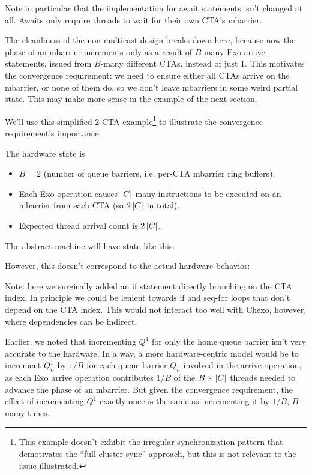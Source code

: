 \filbreak
Note in particular that the implementation for await statements isn't changed at all.
Awaits only require threads to wait for their own CTA's mbarrier.

\filbreak
The cleanliness of the non-multicast design breaks down here, because now the phase of an mbarrier increments only as a result of $B$-many Exo arrive statements, issued from $B$-many different CTAs, instead of just 1.
This motivates the convergence requirement: we need to ensure either all CTAs arrive on the mbarrier, or none of them do, so we don't leave mbarriers in some weird partial state.
This may make more sense in the example of the next section.

\filbreak
{}

We'll use this simplified 2-CTA example\footnote{This example doesn't exhibit the irregular synchronization pattern that demotivates the ``full cluster sync'' approach, but this is not relevant to the issue illustrated.} to illustrate the convergence requirement's importance:



\filbreak
The hardware state is
\begin{itemize}
  \item $B = 2$ (number of queue barriers, i.e. per-CTA mbarrier ring buffers).
  \filbreak
  \item Each Exo  operation causes $\left \vert C \right\vert$-many  instructions to be executed on an mbarrier from each CTA (so $2\left \vert C \right\vert$  in total).
  \filbreak
  \item Expected thread arrival count is $2\left \vert C \right\vert$.
\end{itemize}

\filbreak
The abstract machine will have state like this:



\filbreak
However, this doesn't correspond to the actual hardware behavior:



\filbreak
Note: here we surgically added an if statement directly branching on the CTA index.
In principle we could be lenient towards if and seq-for loops that don't depend on the CTA index.
This would not interact too well with Chexo, however, where dependencies can be indirect.

\filbreak
Earlier, we noted that incrementing $Q^1$ for only the home queue barrier isn't very accurate to the hardware.
In a way, a more hardware-centric model would be to increment $Q_n^1$ by $1/B$ for each queue barrier $Q_n$ involved in the arrive operation, as each Exo arrive operation contributes $1/B$ of the $B\times\left \vert C \right\vert$ threads needed to advance the phase of an mbarrier.
But given the convergence requirement, the effect of incrementing $Q^1$ exactly once is the same as incrementing it by $1/B$, $B$-many times.

